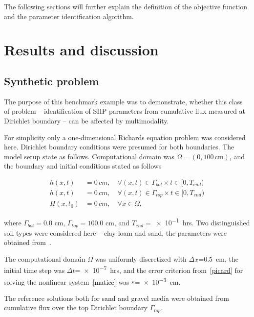 \documentclass[review,times,3p,twocolumn,10pt]{elsarticle}
\newenvironment{lineq}
    {\begin{linenomath*}
    \begin{equation}
    }
    { 
    \end{equation} 
    \end{linenomath*}
    }
\begin{document}
The following sections will further explain the definition of the objective function and the parameter identification algorithm.




 
 

 



\section{Results and discussion} 




\subsection{Synthetic problem}
 \label{benchmarks}
 
The purpose of this benchmark example was to demonstrate, whether this class of problem -- identification of SHP parameters from cumulative flux measured at Dirichlet boundary -- can be affected by multimodality.


 For simplicity only a one-dimensional Richards equation problem was considered here.  Dirichlet boundary conditions were presumed for both boundaries. The model setup state as follows. Computational domain was $\Omega=(0,100\,\mathrm{cm})$, and the boundary and initial conditions stated as follows
 \begin{lineq}
 \begin{split}
 h(x,t) &= 0\, cm, \quad \forall (x,t) \in \Gamma_{bot} \times  t \in [0, T_{end}) \\ 
  h(x,t) &= 0\, cm, \quad \forall (x,t) \in \Gamma_{top} \times  t \in [0, T_{end}) \\ 
  H(x,t_0) &= 0\, cm , \quad \forall x \in \Omega,
  \end{split}
\end{lineq}
 where $\Gamma_{bot}=0.0$ cm, $\Gamma_{top}=100.0$ cm, and $T_{end}=$\num{e-1}~hrs. Two distinguished soil types were considered here -- clay loam and sand, the parameters were obtained from~\citep{retc}.
 

 
  The computational domain $\Omega$ was uniformly discretized with $\Delta x$=0.5~cm, the initial time step was $\Delta t$=\num{e-7}~hrs, and the error criterion from~\eqref{picard} for solving the nonlinear system~\eqref{matice} was   $\varepsilon$=\num{e-3}~cm.
 
 The reference solutions both for sand and gravel media were obtained from  cumulative flux over the top Dirichlet boundary $\Gamma_{top}$.
 
\end{document}
